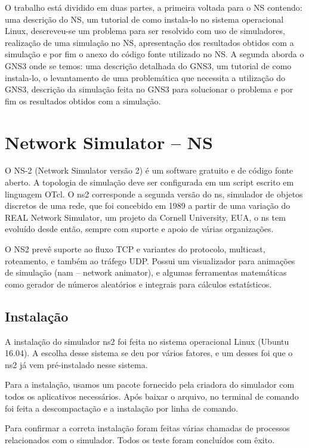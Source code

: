 \documentclass[12pt]{article}
\begin{document}
O trabalho está dividido em duas partes, a primeira voltada para o NS contendo: uma descrição do NS, um tutorial de como instala-lo no sistema operacional Linux, descreveu-se um problema para ser resolvido com uso de simuladores, realização de uma simulação no NS, apresentação dos resultados obtidos com a simulação e por fim o anexo do código fonte utilizado no NS.  A segunda aborda o GNS3 onde se temos: uma descrição detalhada do GNS3, um tutorial de como instala-lo, o levantamento de uma problemática que necessita a utilização do GNS3, descrição da simulação feita no GNS3 para solucionar o problema e por fim os resultados obtidos com a simulação.   

\section{Network Simulator – NS} \label{sec:firstpage}

O NS-2 (Network Simulator versão 2) é um software gratuito e de código fonte aberto.  A topologia de simulação deve ser configurada em um script escrito em linguagem OTcl. O ns2 corresponde a segunda versão do ns, simulador de objetos discretos de uma rede, que foi concebido em 1989 a partir de uma variação do REAL Network Simulator, um projeto da Cornell University, EUA, o ns tem evoluído desde então, sempre com suporte e apoio de várias organizações.

O NS2 prevê suporte ao fluxo TCP e variantes do protocolo, multicast, roteamento, e também ao tráfego UDP. Possui um visualizador para animações de simulação (nam – network animator), e algumas ferramentas matemáticas como gerador de números aleatórios e integrais para cálculos estatísticos.

\subsection{Instalação}
A instalação do simulador ns2 foi feita no sistema operacional Linux (Ubuntu 16.04). A escolha desse sistema se deu por vários fatores, e um desses foi que o ns2 já vem pré-instalado nesse sistema.

Para a instalação, usamos um pacote fornecido pela criadora do simulador com todos os aplicativos necessários. Após baixar o arquivo, no terminal de comando foi feita a descompactação e a instalação por linha de comando.

Para confirmar a correta instalação foram feitas várias chamadas de processos relacionados com o simulador. Todos os teste foram concluídos com êxito.
\end{document}
